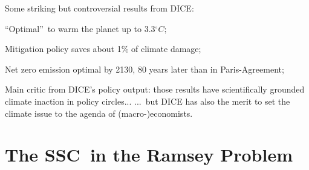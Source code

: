 \documentclass[xcolor=x11names,compress,aspectratio=169]{beamer}%
\makeatletter
\providecommand{\U}[1]{\protect\rule{.1in}{.1in}}
\newenvironment{stepitemizewithalert}{\begin{itemize}[<+-| alert@+>]}{\end{itemize} }
\renewenvironment{itemize}{\begin{compactitemize}[<+-| alert@+>]}{\end{compactitemize}}
\renewenvironment{stepitemizewithalert}{\begin{compactitemize}[<+-| alert@+>]}{\end{compactitemize}}
\renewenvironment{stepitemizewithalert}{\begin{itemize}}{\end{itemize}}
\makeatother
\begin{document}
\begin{frame}%


Some striking but controversial results from DICE:%
\vspace{1.5ex}%


\begin{stepitemizewithalert}
\item \textquotedblleft Optimal\textquotedblright\ to warm the planet up to
3.3$%
{{}^\circ}%
C;$%
\vspace{1.5ex}%


\item Mitigation policy saves about 1\% of climate damage;%
\vspace{1.5ex}%


\item Net zero emission optimal by 2130, 80 years later than in
Paris-Agreement;%
\vspace{1.5ex}%


\item Main critic from DICE's policy output: those results have scientifically
grounded climate inaction in policy circles...%
\vspace{1.5ex}%
\newline...\ but DICE has also the merit to set the climate issue to the
agenda of (macro-)economists.
\end{stepitemizewithalert}

%

\transboxout
\end{frame}%


\section{The SSC\ in the Ramsey Problem}%
\end{document}
